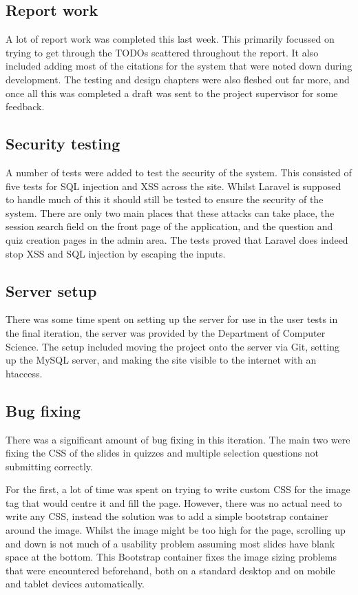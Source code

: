 \subsection{Report work}
A lot of report work was completed this last week. This primarily focussed on trying to get through the TODOs scattered throughout the report. It also included adding most of the citations for the system that were noted down during development. The testing and design chapters were also fleshed out far more, and once all this was completed a draft was sent to the project supervisor for some feedback.

\subsection{Security testing}
A number of tests were added to test the security of the system. This consisted of five tests for SQL injection and XSS across the site. Whilst Laravel is supposed to handle much of this it should still be tested to ensure the security of the system. There are only two main places that these attacks can take place, the session search field on the front page of the application, and the question and quiz creation pages in the admin area. The tests proved that Laravel does indeed stop XSS and SQL injection by escaping the inputs.

\subsection{Server setup}
There was some time spent on setting up the server for use in the user tests in the final iteration, the server was provided by the Department of Computer Science. The setup included moving the project onto the server via Git, setting up the MySQL server, and making the site visible to the internet with an htaccess.
\newpage

\subsection{Bug fixing}
There was a significant amount of bug fixing in this iteration. The main two were fixing the CSS of the slides in quizzes and multiple selection questions not submitting correctly. 

For the first, a lot of time was spent on trying to write custom CSS for the image tag that would centre it and fill the page. However, there was no actual need to write any CSS, instead the solution was to add a simple bootstrap container around the image. Whilst the image might be too high for the page, scrolling up and down is not much of a usability problem assuming most slides have blank space at the bottom. This Bootstrap container fixes the image sizing problems that were encountered beforehand, both on a standard desktop and on mobile and tablet devices automatically.

